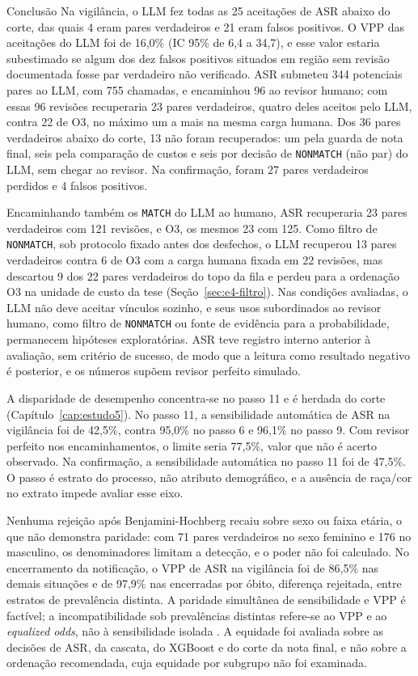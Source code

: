 \begin{chapter}{Conclusão}
Na vigilância, o LLM fez todas as 25 aceitações de ASR abaixo do corte, das quais 4 eram pares verdadeiros e 21 eram falsos positivos. O VPP das aceitações do LLM foi de 16,0\% (IC 95\% de 6,4 a 34,7), e esse valor estaria subestimado se algum dos dez falsos positivos situados em região sem revisão documentada fosse par verdadeiro não verificado. ASR submeteu 344 potenciais pares ao LLM, com 755 chamadas, e encaminhou 96 ao revisor humano; com essas 96 revisões recuperaria 23 pares verdadeiros, quatro deles aceitos pelo LLM, contra 22 de O3, no máximo um a mais na mesma carga humana. Dos 36 pares verdadeiros abaixo do corte, 13 não foram recuperados: um pela guarda de nota final, seis pela comparação de custos e seis por decisão de \texttt{NONMATCH} (não par) do LLM, sem chegar ao revisor. Na confirmação, foram 27 pares verdadeiros perdidos e 4 falsos positivos.

Encaminhando também os \texttt{MATCH} do LLM ao humano, ASR recuperaria 23 pares verdadeiros com 121 revisões, e O3, os mesmos 23 com 125. Como filtro de \texttt{NONMATCH}, sob protocolo fixado antes dos desfechos, o LLM recuperou 13 pares verdadeiros contra 6 de O3 com a carga humana fixada em 22 revisões, mas descartou 9 dos 22 pares verdadeiros do topo da fila e perdeu para a ordenação O3 na unidade de custo da tese (Seção~\ref{sec:e4-filtro}). Nas condições avaliadas, o LLM não deve aceitar vínculos sozinho, e seus usos subordinados ao revisor humano, como filtro de \texttt{NONMATCH} ou fonte de evidência para a probabilidade, permanecem hipóteses exploratórias. ASR teve registro interno anterior à avaliação, sem critério de sucesso, de modo que a leitura como resultado negativo é posterior, e os números supõem revisor perfeito simulado.

A disparidade de desempenho concentra-se no passo 11 e é herdada do corte (Capítulo~\ref{cap:estudo5}). No passo 11, a sensibilidade automática de ASR na vigilância foi de 42,5\%, contra 95,0\% no passo 6 e 96,1\% no passo 9. Com revisor perfeito nos encaminhamentos, o limite seria 77,5\%, valor que não é acerto observado. Na confirmação, a sensibilidade automática no passo 11 foi de 47,5\%. O passo é estrato do processo, não atributo demográfico, e a ausência de raça/cor no extrato impede avaliar esse eixo.

Nenhuma rejeição após Benjamini-Hochberg recaiu sobre sexo ou faixa etária, o que não demonstra paridade: com 71 pares verdadeiros no sexo feminino e 176 no masculino, os denominadores limitam a detecção, e o poder não foi calculado. No encerramento da notificação, o VPP de ASR na vigilância foi de 86,5\% nas demais situações e de 97,9\% nas encerradas por óbito, diferença rejeitada, entre estratos de prevalência distinta. A paridade simultânea de sensibilidade e VPP é factível; a incompatibilidade sob prevalências distintas refere-se ao VPP e ao \textit{equalized odds}, não à sensibilidade isolada \cite{Kleinberg2016inherent,Chouldechova2017fair}. A equidade foi avaliada sobre as decisões de ASR, da cascata, do XGBoost e do corte da nota final, e não sobre a ordenação recomendada, cuja equidade por subgrupo não foi examinada.


\end{chapter}
